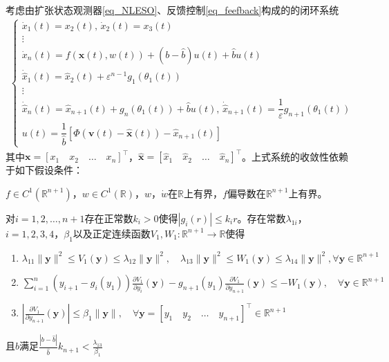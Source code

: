 考虑由扩张状态观测器\eqref{eq_NLESO}、反馈控制\eqref{eq_feefback}构成的的闭环系统
\begin{align}
\left\{\begin{array}{l}
\dot{x}_{1}(t)=x_{2}(t),\,\dot{x}_{2}(t)=x_{3}(t) \\
\vdots \\
\dot{x}_{n}(t)=f(\bm{x}(t), w(t))+\left(b-\hat{b}\right) u(t)+\hat{b} u(t) \\
\dot{\hat{x}}_{1}(t)=\hat{x}_{2}(t)+\varepsilon^{n-1} g_{1}\left(\theta_{1}(t)\right) \\
\vdots \\
\dot{\hat{x}}_{n}(t)=\hat{x}_{n+1}(t)+g_{n}\left(\theta_{1}(t)\right)+\hat{b} u(t) ,\,
\dot{\hat{x}}_{n+1}(t)=\dfrac{1}{\varepsilon} g_{n+1}\left(\theta_{1}(t)\right) \\
u(t)=\dfrac{1}{\hat{b}}\left[\Phi\left(\bm{v}(t)-\hat{\bm{x}}(t)\right)-\hat{x}_{n+1}(t)\right]
\end{array}\right.	\label{eq_close}
\end{align}
其中${\bm{x}}=\left[{x}_{1} \quad {x}_{2} \quad \ldots \quad {x}_{n}\right]^\top $，$\hat{\bm{x}}=\left[\hat{x}_{1} \quad \hat{x}_{2} \quad \ldots \quad \hat{x}_{n}\right]^\top $。上式系统的收敛性依赖于如下假设条件\cite{Guo_2012a}：

\begin{assumption}
	$f \in C^{1}\left(\mathbb{R}^{n+1}\right)$，$ w \in C^{1}(\mathbb{R})$，$ w$，$\dot{w}$在$ \mathbb{R} $上有界，$f$偏导数在$\mathbb{R}^{n+1}$上有界。	\label{A1}
\end{assumption}

\begin{assumption}
	对$ i=1,2,\ldots,n+1 $存在正常数$ k_i >0 $使得$\left|g_{i}(r)\right| \leq k_{i} r$。存在常数$\lambda_{1 i}$，$i=1,2,3,4$，$\beta_{1}$以及正定连续函数$V_1, W_1: \mathbb{R}^{n+1} \rightarrow \mathbb{R}$使得
	\begin{enumerate}
		\item $ \lambda_{11}\|\bm{y}\|^{2} \leq V_{1}(\bm{y}) \leq \lambda_{12}\|\bm{y}\|^{2}, \quad \lambda_{13}\|\bm{y}\|^{2} \leq W_{1}(\bm{y}) \leq \lambda_{14}\|\bm{y}\|^{2}, \forall \bm{y} \in \mathbb{R}^{n+1} $
		\item $ \sum_{i=1}^{n}\left(y_{i+1}-g_{i}\left(y_{1}\right)\right) \frac{\partial V_{1}}{\partial y_{i}}(\bm{y})-g_{n+1}\left(y_{1}\right) \frac{\partial V_{1}}{\partial y_{n+1}}(\bm{y}) \leq-W_{1}(\bm{y}),\quad \forall \bm{y} \in \mathbb{R}^{n+1} $
		\item $ \left|\frac{\partial V_{1}}{\partial y_{n+1}}(\bm{y})\right| \leq \beta_{1}\|\bm{y}\|,\quad \forall \bm{y}=[y_{1} \quad y_{2} \quad \ldots \quad y_{n+1}]^\top \in \mathbb{R}^{n+1} $	
	\end{enumerate}	\label{A2}
且$ b $满足$\frac{\left|b-\hat{b}\right|}{\hat{b}} k_{n+1}<\frac{\lambda_{13}}{\beta_{1}}$
\end{assumption}

